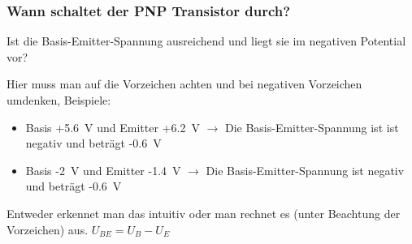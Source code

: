 \begin{frame}
\frametitle{Wann schaltet der PNP Transistor durch?}
Ist die Basis-Emitter-Spannung ausreichend und liegt sie im negativen Potential vor?

Hier muss man auf die Vorzeichen achten und bei negativen Vorzeichen umdenken, Beispiele:

\begin{itemize}
  \item Basis +\qty{5,6}{\volt} und Emitter +\qty{6,2}{\volt} $\rightarrow$ Die Basis-Emitter-Spannung ist ist negativ und beträgt -\qty{0,6}{\volt}
  \item Basis -\qty{2}{\volt} und Emitter -\qty{1,4}{\volt} $\rightarrow$ Die Basis-Emitter-Spannung ist negativ und beträgt -\qty{0,6}{\volt}
  \end{itemize}
    Entweder erkennet man das intuitiv oder man rechnet es (unter Beachtung der Vorzeichen) aus.
    $U_{ BE } = U_{ B } - U_{ E }$
\end{frame}

\begin{frame}
\end{frame}


